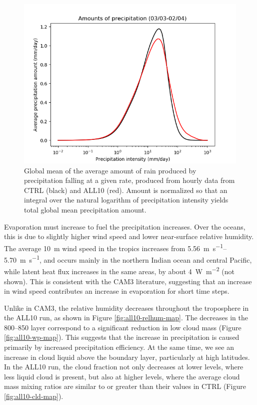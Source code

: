 \documentclass [11pt, proquest] {uwthesis}[2020/02/24]
\begin{document}
\begin{figure}
    \centering
    \includegraphics[width=6.5in]{PRECT_amount_y03m03-y04m02.png}
    \caption[Comparison between CTRL and ALL10, of amount of precipitation falling as a function of intensity of precipitation events]{Global mean of the average amount of rain produced by precipitation falling at a given rate, produced from hourly data from CTRL (black) and ALL10 (red). Amount is normalized so that an integral over the natural logarithm of precipitation intensity yields total global mean precipitation amount.}
    \label{fig:all10-prec-intensity}
\end{figure}

Evaporation must increase to fuel the precipitation increases.  Over the oceans, this is due to slightly higher wind speed and lower near-surface relative humidity. The average \SI{10}{\meter} wind speed in the tropics increases from \SIrange{5.56}{5.70}{\meter\per\second}, and occurs mainly in the northern Indian ocean and central Pacific, while latent heat flux increases in the same areas, by about \SI{4}{\watt\per\meter\squared} (not shown). This is consistent with the CAM3 literature, suggesting that an increase in wind speed contributes an increase in evaporation for short time steps.

Unlike in CAM3, the relative humidity decreases throughout the troposphere in the ALL10 run, as shown in Figure \ref{fig:all10-relhum-map}. The decreases in the \SIrange[range-phrase=--,range-units=single]{800}{850}{\millibar} layer correspond to a significant reduction in low cloud mass (Figure \ref{fig:all10-wp-map}). This suggests that the increase in precipitation is caused primarily by increased precipitation efficiency. At the same time, we see an increase in cloud liquid above the boundary layer, particularly at high latitudes. In the ALL10 run, the cloud fraction not only decreases at lower levels, where less liquid cloud is present, but also at higher levels, where the average cloud mass mixing ratios are similar to or greater than their values in CTRL (Figure \ref{fig:all10-cld-map}).
\end{document}
